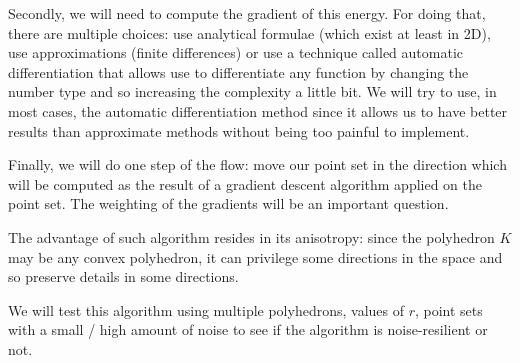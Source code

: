 Secondly, we will need to compute the gradient of this energy. For doing that,
there are multiple choices: use analytical formulae (which exist at least in
2D), use approximations (finite differences) or use a technique called automatic
differentiation that allows use to differentiate any function by changing the
number type and so increasing the complexity a little bit. We will try to use,
in most cases, the automatic differentiation method since it allows us to have
better results than approximate methods without being too painful to implement.

Finally, we will do one step of the flow: move our point set in the direction
which will be computed as the result of a gradient descent algorithm applied on
the point set. The weighting of the gradients will be an important question.

The advantage of such algorithm resides in its anisotropy: since the polyhedron
$ K $ may be any convex polyhedron, it can privilege some directions in the
space and so preserve details in some directions.

We will test this algorithm using multiple polyhedrons, values of $ r
$, point sets with a small / high amount of noise to see if the algorithm is
noise-resilient or not.

